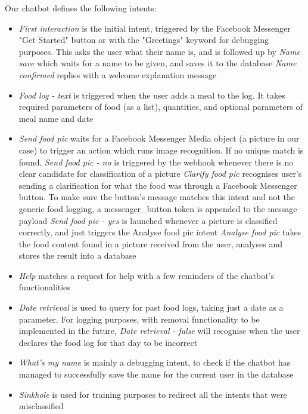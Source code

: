 Our chatbot defines the following intents:
\begin{itemize}
  \item \textit{First interaction} is the initial intent, triggered by the Facebook Messenger "Get Started" button or with the "Greetings" keyword for debugging purposes. This asks the user what their name is, and is followed up by 
  	\subitem \textit{Name save} which waits for a name to be given, and saves it to the database
        \subitem \textit{Name confirmed} replies with a welcome explanation message
\item \textit{Food log - text} is triggered when the user adds a meal to the log. It takes required parameters of food (as a list), quantities, and optional parameters of meal name and date
\item \textit{Send food pic} waits for a Facebook Messenger Media object (a picture in our case) to trigger an action which runs image recognition. If no unique match is found, 
  \subitem \textit{Send food pic - no} is triggered by the webhook whenever there is no clear candidate for classification of a picture
  \subsubitem \textit{Clarify food pic} recognises user's sending a clarification for what the food was through a Facebook Messenger button. To make sure the button's message matches this intent and not the generic food logging, a messenger\_button token is appended to the message payload
  \subitem \textit{Send food pic - yes} is launched whenever a picture is classified correctly, and just triggers the Analyse food pic intent
  \subitem \textit{Analyse food pic} takes the food content found in a picture received from the user, analyses and stores the result into a database
  \item \textit{Help} matches a request for help with a few reminders of the chatbot's functionalities
  \item \textit{Date retrieval} is used to query for past food logs, taking just a date as a parameter. For logging purposes, with removal functionality to be implemented in the future,
	  \subitem \textit{Date retrieval - false} will recognise when the user declares the food log for that day to be incorrect
  \item \textit{What's my name} is mainly a debugging intent, to check if the chatbot has managed to successfully save the name for the current user in the database
  \item \textit{Sinkhole} is used for training purposes to redirect all the intents that were misclassified
\end{itemize}
